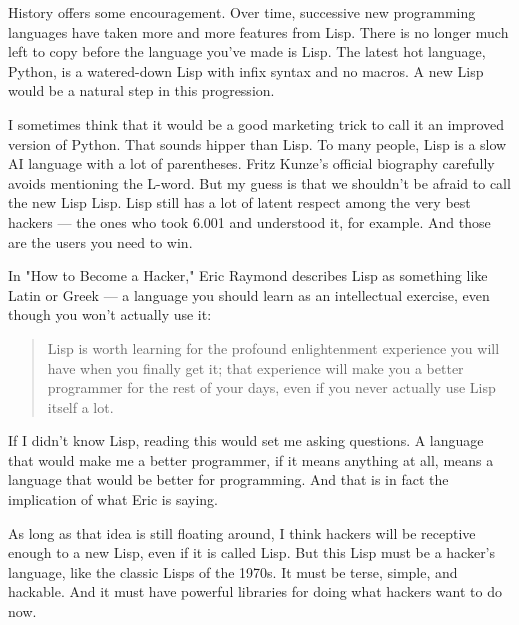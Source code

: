 History offers some encouragement. Over
                  time, successive new programming languages have taken more and
                  more features from Lisp. There is no longer much left to copy
                  before the language you've made is Lisp. The latest hot
                  language, Python, is a watered-down Lisp with infix syntax and
                  no macros. A new Lisp would be a natural step in this
                  progression.

I sometimes think that it would be a
                  good marketing trick to call it an improved version of Python.
                  That sounds hipper than Lisp. To many people, Lisp is a slow
                  AI language with a lot of parentheses. Fritz Kunze's official
                  biography carefully avoids mentioning the L-word. But my guess
                  is that we shouldn't be afraid to call the new Lisp Lisp. Lisp
                  still has a lot of latent respect among the very best hackers
                  --- the ones who took 6.001 and understood it, for
                  example. And those are the users you need to win.

In
                  "How to Become a Hacker," Eric Raymond describes Lisp as
                  something like Latin or Greek --- a language you should
                  learn as an intellectual exercise, even though you won't
                  actually use it:
                  \begin{quote}

                    Lisp is worth learning for the profound enlightenment
                    experience you will have when you finally get it; that
                    experience will make you a better programmer for the rest of
                    your days, even if you never actually use Lisp itself a lot.
                  
\end{quote}

                  If I didn't know Lisp, reading this would set me asking
                  questions. A language that would make me a better programmer,
                  if it means anything at all, means a language that would be
                  better for programming. And that is in fact the implication of
                  what Eric is saying.

As long as that idea is still
                  floating around, I think hackers will be receptive enough to a
                  new Lisp, even if it is called Lisp. But this Lisp must be a
                  hacker's language, like the classic Lisps of the 1970s. It
                  must be terse, simple, and hackable. And it must have powerful
                  libraries for doing what hackers want to do now.

